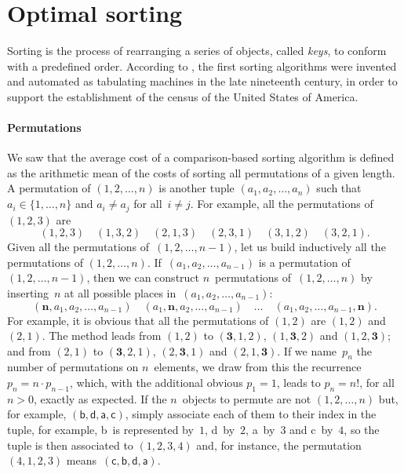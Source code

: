 \section{Optimal sorting}
\label{sec:opt_sort}

Sorting is the process of rearranging a series of objects, called
\emph{keys}, to conform with a predefined
order. According to \cite{Knuth_1998}, the first sorting algorithms
were invented and automated as tabulating machines in the late
nineteenth century, in order to support the establishment of the
census of the United States of America.

\paragraph{Permutations}
\label{par:permutations}

We saw  that the average cost of a
comparison\hyp{}based sorting algorithm is defined as the arithmetic
mean of the costs of sorting all permutations of a given length. A
permutation of \((1,2,\dots,n)\) is another tuple
\((a_1,a_2,\dots,a_n)\) such that \(a_i \in \{1,\dots,n\}\) and \(a_i
\neq a_j\) for all~\(i \neq j\). For example, all the permutations
of~\((1,2,3)\) are
\begin{equation*}
(1,2,3) \quad (1,3,2) \quad (2,1,3) \quad (2,3,1) \quad (3,1,2) \quad
(3,2,1).
\end{equation*}
Given all the permutations of~\((1,2,\dots,n-1)\), let us build
inductively all the permutations of
\((1,2,\dots,n)\). If~\((a_1,a_2,\dots,a_{n-1})\) is a permutation of
\((1,2,\dots,n-1)\), then we can construct \(n\)~permutations
of~\((1,2,\dots,n)\) by inserting~\(n\) at all possible places
in~\((a_1,a_2,\dots,a_{n-1})\):
\begin{equation*}
(\boldsymbol{n},a_1,a_2,\dots,a_{n-1})\quad
(a_1,\boldsymbol{n},a_2,\dots,a_{n-1})\quad \ldots \quad
(a_1,a_2,\dots,a_{n-1},\boldsymbol{n}).
\end{equation*}
For example, it is obvious that all the permutations of \((1,2)\) are
\((1,2)\) and \((2,1)\). The method leads from \((1,2)\) to
\((\boldsymbol{3},1,2)\), \((1,\boldsymbol{3},2)\) and
\((1,2,\boldsymbol{3})\); and from \((2,1)\) to
\((\boldsymbol{3},2,1)\), \((2,\boldsymbol{3},1)\) and
\((2,1,\boldsymbol{3})\). If we name~\(p_n\) the number of
permutations on \(n\)~elements, we draw from this the recurrence \(p_n
= n \cdot p_{n-1}\), which, with the additional obvious \(p_1 = 1\),
leads to \({p_n = n!}\), for all \({n > 0}\), exactly as expected. If
the \(n\)~objects to permute are not \((1,2,\dots,n)\) but, for
example, \((\textsf{b},\textsf{d},\textsf{a},\textsf{c})\), simply
associate each of them to their index in the tuple, for example,
\textsf{b}~is represented by~\(1\), \textsf{d}~by~\(2\),
\textsf{a}~by~\(3\) and \textsf{c}~by~\(4\), so the tuple is then
associated to \((1,2,3,4)\) and, for instance, the permutation
\((4,1,2,3)\) means~\((\textsf{c},\textsf{b},\textsf{d},\textsf{a})\).

